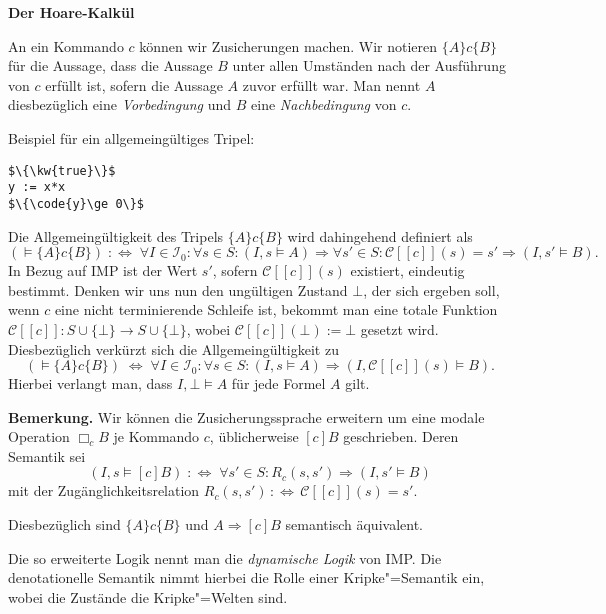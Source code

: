\documentclass[8pt,fleqn,aspectratio=169]{beamer}
\newcommand{\strong}[1]{\textsf{\textbf{#1}}}
\newcommand{\centerheadline}[1]{%
  \begin{center}\strong{#1}\end{center}}
\newcommand{\parspace}{\vspace{0.8em}}
\newcommand{\kw}[1]{\textbf{\texttt{#1}}}
\newcommand{\code}[1]{{\texttt{#1}}}
\newcommand{\qb}[1]{[\!\![#1]\!\!]}
\newcommand{\evC}{\mathcal C}
\begin{document}
\begin{frame}
\centerheadline{Der Hoare-Kalkül}
\end{frame}

\begin{frame}[fragile]
An ein Kommando $c$ können wir Zusicherungen machen. Wir notieren
$\{A\}c\{B\}$ für die Aussage, dass die Aussage $B$ unter allen Umständen
nach der Ausführung von $c$ erfüllt ist, sofern die Aussage $A$ zuvor
erfüllt war. Man nennt $A$ diesbezüglich eine \emph{Vorbedingung}
und $B$ eine \emph{Nachbedingung} von $c$.\pause

\parspace
Beispiel für ein allgemeingültiges Tripel:
\begin{lstlisting}[language=IMP, xleftmargin=\mathindent, mathescape]
$\{\kw{true}\}$
y := x*x
$\{\code{y}\ge 0\}$
\end{lstlisting}
\end{frame}

\begin{frame}
Die Allgemeingültigkeit des Tripels $\{A\}c\{B\}$ wird dahingehend
definiert als
\[(\models\{A\}c \{B\}) \;:\Leftrightarrow\; \forall I\in\mathcal I_0\colon\forall s\in S\colon
(I,s\models A)\Rightarrow\forall s'\in S\colon \evC\qb{c}(s)=s'\Rightarrow (I,s'\models B).\]\pause
{\footnotesize In Bezug auf IMP ist der Wert $s'$,
sofern $\evC\qb{c}(s)$ existiert, eindeutig bestimmt.
Denken wir uns nun den ungültigen Zustand $\bot$, der sich ergeben soll,
wenn $c$ eine nicht terminierende Schleife ist, bekommt man eine totale Funktion
$\evC\qb{c}\colon S\cup\{\bot\}\to S\cup\{\bot\}$, wobei $\evC\qb{c}(\bot):=\bot$
gesetzt wird. Diesbezüglich verkürzt sich die Allgemeingültigkeit zu
\[(\models\{A\}c \{B\}) \;\Leftrightarrow\; \forall I\in\mathcal I_0\colon\forall s\in S\colon
(I,s\models A)\Rightarrow (I,\evC\qb{c}(s)\models B).\]
Hierbei verlangt man, dass $I,\bot\models A$ für jede Formel $A$ gilt.}
\end{frame}

\begin{frame}
\strong{Bemerkung.}
Wir können die Zusicherungssprache erweitern um eine modale Operation
$\Box_c B$ je Kommando $c$, üblicherweise $[c]B$ geschrieben.\pause{} Deren Semantik sei
\[(I,s\models [c]B) \;:\Leftrightarrow\; \forall s'\in S\colon R_c(s,s')\Rightarrow (I,s'\models B)\]
mit der Zugänglichkeitsrelation $R_c(s,s')\,:\Leftrightarrow\, \evC\qb{c}(s)=s'$.\pause

\parspace
Diesbezüglich sind $\{A\}c\{B\}$ und $A\Rightarrow [c]B$ semantisch äquivalent.\pause

\parspace
Die so erweiterte Logik nennt man die \emph{dynamische Logik} von IMP.
Die denotationelle Semantik nimmt hierbei die Rolle einer Kripke"=Semantik
ein, wobei die Zustände die Kripke"=Welten sind.
\end{frame}
\end{document}
